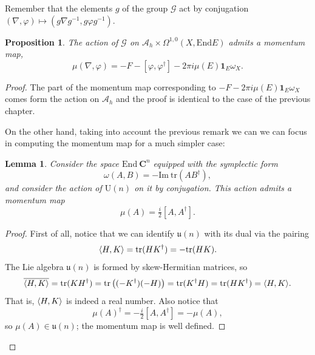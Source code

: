 \documentclass[12pt,a4paper]{book}
\newtheorem{prop}[thm]{Proposition}
\newtheorem{lema}[thm]{Lemma}
\theoremstyle{definition} \newtheorem{defn}[thm]{Definition}
\theoremstyle{definition} \newtheorem{ejemplo}[thm]{Example}
\theoremstyle{remark} \newtheorem{rem}[thm]{Remark}
\def\AA{\mathscr{A}}
\def\GG{\mathscr{G}}
\def\CC{\mathbf{C}}
\def\tr{\mathrm{tr}}
\def\id{\mathbf{1}}
\def\End{\mathrm{End}}
\def\UU{\mathrm{U}}
\def\uu{\mathfrak{u}}
\DeclarePairedDelimiter\esc{\langle}{\rangle}
\begin{document}
	  Remember that the elements $g$ of the group $\GG$ act by conjugation $(\nabla,\varphi)\mapsto (g\nabla g^{-1},g\varphi g^{-1})$. 
	  \begin{prop}
	    The action of $\GG$ on $\AA_h\times \Omega^{1,0}(X,\End E)$ admits a momentum map,
	  \begin{equation*}
	    \mu(\nabla,\varphi)=-F-[\varphi,\varphi^\dagger]-2\pi i \mu(E) \id_E \omega_X.
	  \end{equation*}
	  \end{prop}
	  \begin{proof}
	    The part of the momentum map corresponding to $-F-2\pi i \mu(E) \id_E \omega_X$ comes form the action on $\AA_h$ and the proof is identical to the case of the previous chapter. 
	    
	    On the other hand, taking into account the previous remark we can we can focus in computing the momentum map for a much simpler case:
	    \begin{lema}
	    Consider the space $\End\ \CC^n$ equipped with the symplectic form
	    \begin{equation*}
	      \omega(A,B)=-\mathrm{Im}\ \tr(AB^{\dagger}),
	    \end{equation*}
	    and consider the action of $\UU(n)$ on it by conjugation. This action admits a momentum map
	    \begin{equation*}
	      \mu(A)= \tfrac{i}{2} [A,A^{\dagger}].
	    \end{equation*}
	    \end{lema}
	    \begin{proof}
	      First of all, notice that we can identify $\uu(n)$ with its dual via the pairing
	      \begin{equation*}
		\esc{H,K}=\tr(HK^\dagger)=-\tr(HK).
	      \end{equation*}
	      The Lie algebra $\uu(n)$ is formed by skew-Hermitian matrices, so
	      \begin{equation*}
		\overline{\esc{H,K}}=\tr(KH^\dagger)=\tr\left( (-K^\dagger)(-H) \right)=\tr (K^\dagger H) =\tr (HK^\dagger ) = \esc{H,K}.
	      \end{equation*}
	      That is, $\esc{H,K}$ is indeed a real number. Also notice that 
	      \begin{equation*}
		\mu(A)^{\dagger}=-\tfrac{i}{2}[A,A^{\dagger}]=-\mu(A),
	      \end{equation*}
	      so $\mu(A) \in \uu(n)$; the momentum map is well defined.
	      

\end{proof}
\end{proof}
\end{document}
